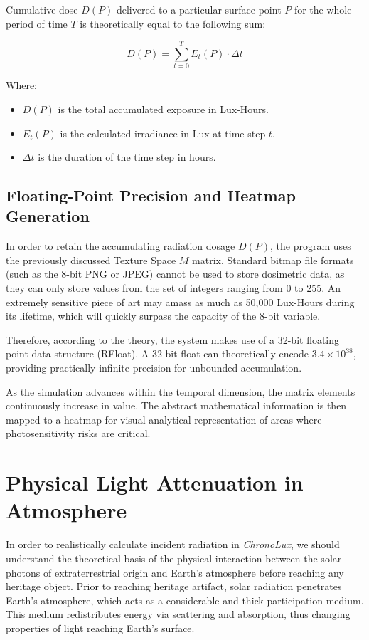 Cumulative dose $D(P)$ delivered to a particular surface point $P$ for the whole period of time $T$ is theoretically equal to the following sum:

\begin{equation}
    D(P) = \sum_{t=0}^{T} E_t(P) \cdot \Delta t
\end{equation}

Where:
\begin{itemize}
    \item $D(P)$ is the total accumulated exposure in Lux-Hours.
    \item $E_t(P)$ is the calculated irradiance in Lux at time step $t$.
    \item $\Delta t$ is the duration of the time step in hours.
\end{itemize}

\subsection{Floating-Point Precision and Heatmap Generation}
In order to retain the accumulating radiation dosage $D(P)$, the program uses the previously discussed Texture Space $M$ matrix. Standard bitmap file formats (such as the 8-bit PNG or JPEG) cannot be used to store dosimetric data, as they can only store values from the set of integers ranging from 0 to 255. An extremely sensitive piece of art may amass as much as 50,000 Lux-Hours during its lifetime, which will quickly surpass the capacity of the 8-bit variable.

Therefore, according to the theory, the system makes use of a 32-bit floating point data structure (RFloat). A 32-bit float can theoretically encode $3.4 \times 10^{38}$, providing practically infinite precision for unbounded accumulation.

As the simulation advances within the temporal dimension, the matrix elements continuously increase in value. The abstract mathematical information is then mapped to a heatmap for visual analytical representation of areas where photosensitivity risks are critical.

\section{Physical Light Attenuation in Atmosphere}
In order to realistically calculate incident radiation in \textit{ChronoLux}, we should understand the theoretical basis of the physical interaction between the solar photons of extraterrestrial origin and Earth's atmosphere before reaching any heritage object. Prior to reaching heritage artifact, solar radiation penetrates Earth's atmosphere, which acts as a considerable and thick participation medium. This medium redistributes energy via scattering and absorption, thus changing properties of light reaching Earth's surface.

